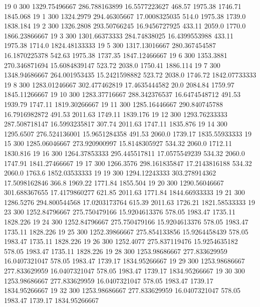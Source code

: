 19  0  300  1329.75496667  286.788163899  16.5577223627  468.57  1975.38  1746.71  1845.068 
19  1  300  1324.2979  294.46305667  17.0008325035  514.0  1975.38  1739.0  1838.184 
19  2  300  1326.2808  293.50766245  16.9456727925  433.11  2059.0  1770.0  1866.23866667 
19  3  300  1301.66373333  284.74838025  16.4399553988  433.11  1975.38  1714.0  1824.48133333 
19  5  300  1317.13016667  280.367454587  16.1870225378  542.63  1975.38  1737.35  1847.12466667 
19  6  300  1353.3881  270.346871694  15.6084839147  523.72  2038.0  1750.41  1886.114 
19  7  300  1348.94686667  264.001953435  15.2421598882  523.72  2038.0  1746.72  1842.07733333 
19  8  300  1283.01246667  302.477462819  17.4635444582  20.0  2084.84  1759.97  1845.11266667 
19  10  300  1283.37716667  288.342376537  16.6474548712  491.53  1939.79  1747.11  1819.30266667 
19  11  300  1285.16446667  290.840745788  16.7916982872  491.53  2011.63  1749.11  1839.176 
19  12  300  1293.76233333  287.508718147  16.5993235817  307.74  2011.63  1747.11  1835.876 
19  14  300  1295.6507  276.524136001  15.9651284358  491.53  2060.0  1739.17  1835.55933333 
19  15  300  1285.06046667  273.920900997  15.8148305927  534.32  2060.0  1712.11  1830.816 
19  16  300  1264.37853333  295.445517811  17.0575549239  534.32  2060.0  1747.91  1841.27466667 
19  17  300  1266.3576  298.161835847  17.2143816188  534.32  2060.0  1763.6  1852.03533333 
19  19  300  1294.12243333  303.278914362  17.5098162846  366.8  1969.22  1771.84  1855.504 
19  20  300  1290.56046667  301.688367655  17.4179860277  621.85  2011.63  1771.84  1844.66933333 
19  21  300  1286.5276  294.800544568  17.0203173764  615.39  2011.63  1726.21  1821.58533333 
19  23  300  1252.84796667  275.750479166  15.9204613376  578.05  1983.47  1735.11  1828.226 
19  24  300  1252.84796667  275.750479166  15.9204613376  578.05  1983.47  1735.11  1828.226 
19  25  300  1252.39866667  275.854133856  15.9264458439  578.05  1983.47  1735.11  1828.226 
19  26  300  1252.4077  275.837119476  15.9254635182  578.05  1983.47  1735.11  1828.226 
19  28  300  1253.98686667  277.833629959  16.0407321047  578.05  1983.47  1739.17  1834.95266667 
19  29  300  1253.98686667  277.833629959  16.0407321047  578.05  1983.47  1739.17  1834.95266667 
19  30  300  1253.98686667  277.833629959  16.0407321047  578.05  1983.47  1739.17  1834.95266667 
19  32  300  1253.98686667  277.833629959  16.0407321047  578.05  1983.47  1739.17  1834.95266667 

